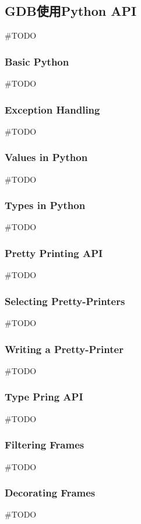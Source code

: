 \subsection{GDB使用Python API}

\#TODO

\subsubsection{Basic Python}
\#TODO

\subsubsection{Exception Handling}
\#TODO

\subsubsection{Values in Python}
\#TODO

\subsubsection{Types in Python}
\#TODO

\subsubsection{Pretty Printing API}
\#TODO

\subsubsection{Selecting Pretty-Printers}
\#TODO

\subsubsection{Writing a Pretty-Printer}
\#TODO

\subsubsection{Type Pring API}
\#TODO

\subsubsection{Filtering Frames}
\#TODO

\subsubsection{Decorating Frames}
\#TODO

